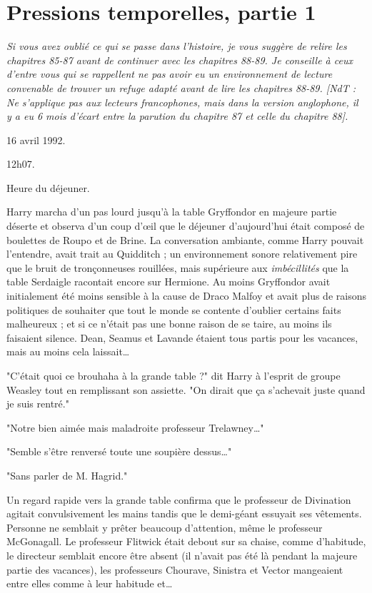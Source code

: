 
\chapter{Pressions temporelles, partie 1}

\emph{Si vous avez oublié ce qui se passe dans l'histoire, je vous suggère de relire les chapitres 85-87 avant de continuer avec les chapitres 88-89. Je conseille à ceux d'entre vous qui se rappellent ne pas avoir eu un environnement de lecture convenable de trouver un refuge adapté avant de lire les chapitres 88-89. [NdT : Ne s'applique pas aux lecteurs francophones, mais dans la version anglophone, il y a eu 6 mois d'écart entre la parution du chapitre 87 et celle du chapitre 88].} 

16 avril 1992.

12h07.

Heure du déjeuner.

Harry marcha d'un pas lourd jusqu'à la table Gryffondor en majeure partie déserte et observa d'un coup d'œil que le déjeuner d'aujourd'hui était composé de boulettes de Roupo et de Brine. La conversation ambiante, comme Harry pouvait l'entendre, avait trait au Quidditch ; un environnement sonore relativement pire que le bruit de tronçonneuses rouillées, mais supérieure aux \emph{imbécillités}  que la table Serdaigle racontait encore sur Hermione. Au moins Gryffondor avait initialement été moins sensible à la cause de Draco Malfoy et avait plus de raisons politiques de souhaiter que tout le monde se contente d'oublier certains faits malheureux ; et si ce n'était pas une bonne raison de se taire, au moins ils faisaient silence. Dean, Seamus et Lavande étaient tous partis pour les vacances, mais au moins cela laissait…

"C'était quoi ce brouhaha à la grande table ?" dit Harry à l'esprit de groupe Weasley tout en remplissant son assiette. "On dirait que ça s'achevait juste quand je suis rentré."

"Notre bien aimée mais maladroite professeur Trelawney…"

"Semble s'être renversé toute une soupière dessus…"

"Sans parler de M. Hagrid."

Un regard rapide vers la grande table confirma que le professeur de Divination agitait convulsivement les mains tandis que le demi-géant essuyait ses vêtements. Personne ne semblait y prêter beaucoup d'attention, même le professeur McGonagall. Le professeur Flitwick était debout sur sa chaise, comme d'habitude, le directeur semblait encore être absent (il n'avait pas été là pendant la majeure partie des vacances), les professeurs Chourave, Sinistra et Vector mangeaient entre elles comme à leur habitude et…

